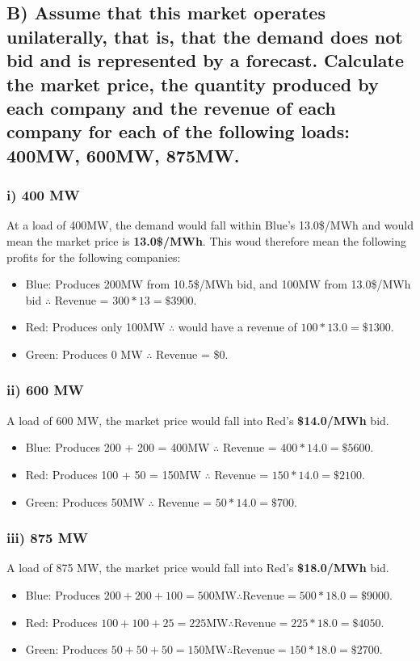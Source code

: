\documentclass{article}
\begin{document}
\subsection{B) Assume that this market operates unilaterally, that is, that the demand does not bid and is represented by a forecast. Calculate the market price, the quantity produced by each company and the revenue of each company for each of the following loads: 400MW, 600MW, 875MW.}

\subsubsection{i) 400 MW}
At a load of 400MW, the demand would fall within Blue's 13.0\$/MWh and would mean the market price is \textbf{13.0\$/MWh}. This woud therefore mean the following profits for the following companies:
\begin{itemize}
	\item Blue: Produces 200MW from 10.5\$/MWh bid, and 100MW from 13.0\$/MWh bid $\therefore$ Revenue = $300*13 = \$3900$.
	\item Red: Produces only 100MW $\therefore$ would have a revenue of $100*13.0= \$1300$.
	\item Green: Produces 0 MW $\therefore$ Revenue = \$0.
\end{itemize}

\pagebreak
\subsubsection{ii) 600 MW}
A load of 600 MW, the market price would fall into Red's \textbf{\$14.0/MWh} bid.
\begin{itemize}
	\item Blue: Produces 200 + 200 = 400MW $\therefore$ Revenue = $400*14.0=\$5600$.
	\item Red: Produces 100 + 50 = 150MW $\therefore$ Revenue = $150*14.0=\$2100$.
	\item Green: Produces 50MW $\therefore$ Revenue = $50*14.0=\$700$.
\end{itemize}

\subsubsection{iii) 875 MW}
A load of 875 MW, the market price would fall into Red's \textbf{\$18.0/MWh} bid.
\begin{itemize}
	\item Blue: Produces $200 + 200 + 100 = 500\text{MW} \therefore \text{Revenue} = 500*18.0=\$9000$.
	\item Red: Produces $100 + 100 + 25 = 225 \text{MW} \therefore \text{Revenue} = 225*18.0=\$4050$.
	\item Green: Produces $50 + 50 + 50 = 150\text{MW} \therefore \text{Revenue} = 150*18.0=\$2700$.
\end{itemize}
\end{document}
